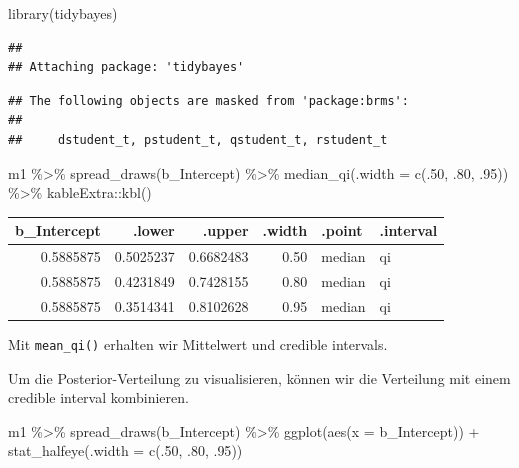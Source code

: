 \documentclass[]{tufte-handout}
\newenvironment{Shaded}{}{}
\newcommand{\AttributeTok}[1]{\textcolor[rgb]{0.49,0.56,0.16}{#1}}
\newcommand{\DecValTok}[1]{\textcolor[rgb]{0.25,0.63,0.44}{#1}}
\newcommand{\FunctionTok}[1]{\textcolor[rgb]{0.02,0.16,0.49}{#1}}
\newcommand{\NormalTok}[1]{#1}
\newcommand{\SpecialCharTok}[1]{\textcolor[rgb]{0.25,0.44,0.63}{#1}}
\begin{document}
\begin{Shaded}
\begin{Highlighting}[]
\FunctionTok{library}\NormalTok{(tidybayes)}
\end{Highlighting}
\end{Shaded}

\begin{verbatim}
## 
## Attaching package: 'tidybayes'
\end{verbatim}

\begin{verbatim}
## The following objects are masked from 'package:brms':
## 
##     dstudent_t, pstudent_t, qstudent_t, rstudent_t
\end{verbatim}

\begin{Shaded}
\begin{Highlighting}[]
\NormalTok{m1 }\SpecialCharTok{\%\textgreater{}\%}
  \FunctionTok{spread\_draws}\NormalTok{(b\_Intercept) }\SpecialCharTok{\%\textgreater{}\%} 
  \FunctionTok{median\_qi}\NormalTok{(}\AttributeTok{.width =} \FunctionTok{c}\NormalTok{(.}\DecValTok{50}\NormalTok{, .}\DecValTok{80}\NormalTok{, .}\DecValTok{95}\NormalTok{)) }\SpecialCharTok{\%\textgreater{}\%} 
\NormalTok{  kableExtra}\SpecialCharTok{::}\FunctionTok{kbl}\NormalTok{()}
\end{Highlighting}
\end{Shaded}

\begin{tabular}[t]{r|r|r|r|l|l}
\hline
b\_Intercept & .lower & .upper & .width & .point & .interval\\
\hline
0.5885875 & 0.5025237 & 0.6682483 & 0.50 & median & qi\\
\hline
0.5885875 & 0.4231849 & 0.7428155 & 0.80 & median & qi\\
\hline
0.5885875 & 0.3514341 & 0.8102628 & 0.95 & median & qi\\
\hline
\end{tabular}

Mit \texttt{mean\_qi()} erhalten wir Mittelwert und credible intervals.

Um die Posterior-Verteilung zu visualisieren, können wir die Verteilung
mit einem credible interval kombinieren.

\begin{Shaded}
\begin{Highlighting}[]
\NormalTok{m1 }\SpecialCharTok{\%\textgreater{}\%}
  \FunctionTok{spread\_draws}\NormalTok{(b\_Intercept) }\SpecialCharTok{\%\textgreater{}\%}
  \FunctionTok{ggplot}\NormalTok{(}\FunctionTok{aes}\NormalTok{(}\AttributeTok{x =}\NormalTok{ b\_Intercept)) }\SpecialCharTok{+}
  \FunctionTok{stat\_halfeye}\NormalTok{(}\AttributeTok{.width =} \FunctionTok{c}\NormalTok{(.}\DecValTok{50}\NormalTok{, .}\DecValTok{80}\NormalTok{, .}\DecValTok{95}\NormalTok{))}
\end{Highlighting}
\end{Shaded}
\end{document}
